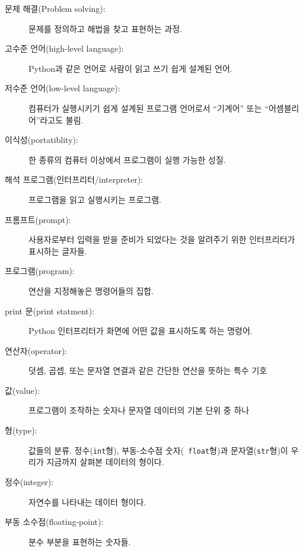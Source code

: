 \documentclass[10pt]{book}
\begin{document}
\begin{description}

\item[문제 해결(Problem solving):]  문제를 정의하고 해법을 찾고 표현하는 과정. 

\item[고수준 언어(high-level language):] Python과 같은 언어로 사람이
  읽고 쓰기 쉽게 설계된 언어.

\item[저수준 언어(low-level language):] 컴퓨터가 실행시키기 쉽게 설계된
  프로그램 언어로서 ``기계어'' 또는 ``어셈블리어''라고도 불림.

\item[이식성(portatiblity):]  한 종류의 컴퓨터 이상에서 프로그램이 실행 가능한 성질.

\item[해석 프로그램(인터프리터/interpreter):]  프로그램을 읽고 실행시키는 프로그램.

\item[프롬프트(prompt):] 사용자로부터 입력을 받을 준비가 되었다는 것을
  알려주기 위한 인터프리터가 표시하는 글자들.

\item[프로그램(program):] 연산을 지정해놓은 명령어들의 집합.

\item[print 문(print statment):] Python 인터프리터가 화면에 어떤 값을
  표시하도록 하는 명령어.

\item[연산자(operator):] 덧셈, 곱셉, 또는 문자열 연결과 같은 간단한
  연산을 뜻하는 특수 기호

\item[값(value):]  프로그램이 조작하는 숫자나 문자열 데이터의 기본 단위 중 하나

\item[형(type):] 값들의 분류. 정수({\tt int}형), 부동-소수점 숫자({\tt
    float}형)과 문자열({\tt str}형)이 우리가 지금까지 살펴본 데이터의
  형이다.

\item[정수(integer):] 자연수를 나타내는 데이터 형이다. 

\item[부동 소수점(floating-point):] 분수 부분을 표현하는 숫자들.


\end{description}
\end{document}

